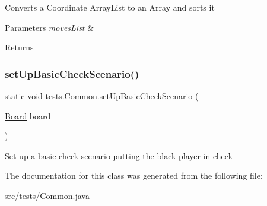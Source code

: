 Converts a Coordinate Array\+List to an Array and sorts it 
\begin{DoxyParams}{Parameters}
{\em moves\+List} & \\
\hline
\end{DoxyParams}
\begin{DoxyReturn}{Returns}

\end{DoxyReturn}
\hypertarget{classtests_1_1_common_a935d4c1745869db3bce70b6b17044d58}{}\label{classtests_1_1_common_a935d4c1745869db3bce70b6b17044d58} 
\subsubsection{\texorpdfstring{set\+Up\+Basic\+Check\+Scenario()}{setUpBasicCheckScenario()}}
{\footnotesize\ttfamily static void tests.\+Common.\+set\+Up\+Basic\+Check\+Scenario (\begin{DoxyParamCaption}\item[{\hyperlink{classmain_1_1model_1_1_board}{Board}}]{board }\end{DoxyParamCaption})\hspace{0.3cm}{\ttfamily [static]}}

Set up a basic check scenario putting the black player in check 

The documentation for this class was generated from the following file\+:\begin{DoxyCompactItemize}
\item 
src/tests/Common.\+java\end{DoxyCompactItemize}
